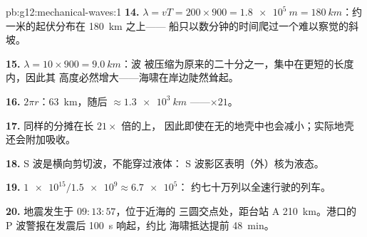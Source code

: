 \begin{solution}{pb:g12:mechanical-waves:1}
\textbf{14.} $\lambda = vT = 200 \times 900 = \qty{1.8e5}{m} =
\qty{180}{km}$：约一米的起伏分布在 \qty{180}{km} 之上——
船只以数分钟的时间爬过一个难以察觉的斜坡。

\textbf{15.} $\lambda = 10 \times 900 = \qty{9.0}{km}$：波
被压缩为原来的二十分之一，集中在更短的长度内，因此其
高度必然增大——海啸在岸边陡然耸起。

\textbf{16.} $2\pi r$：\qty{63}{km}，随后 $\approx \qty{1.3e3}{km}$
——$\times 21$。

\textbf{17.} 同样的分摊在长 $21\times$ 倍的上，
因此即使在无的地壳中也会减小；实际地壳
还会附加吸收。

\textbf{18.} S 波是横向剪切波，不能穿过液体：
S 波影区表明（外）核为液态。

\textbf{19.} $\num{1e15}/\num{1.5e9} \approx \num{6.7e5}$：
约七十万列以全速行驶的列车。

\textbf{20.} 地震发生于 $09{:}13{:}57$，位于近海的
三圆交点处，距台站 A \qty{210}{km}。港口的
P 波警报在发震后 \qty{100}{s} 响起，约比
海啸抵达提前 \qty{48}{min}。
\end{solution}

